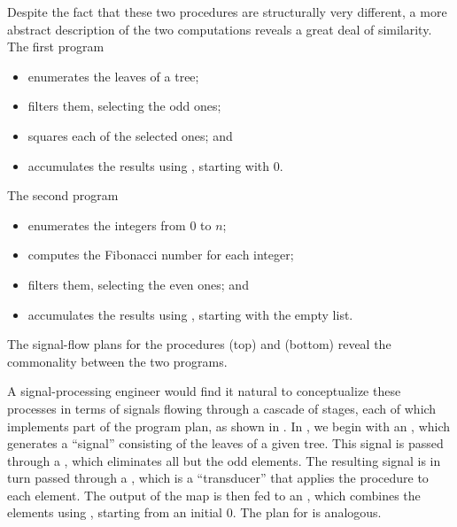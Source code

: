 \noindent
Despite the fact that these two procedures are structurally very different, a
more abstract description of the two computations reveals a great deal of
similarity.  The first program

\begin{itemize}
\item
enumerates the leaves of a tree;

\item
filters them, selecting the odd ones;

\item
squares each of the selected ones; and

\item
accumulates the results using \code{+}, starting with 0.
\end{itemize}

\noindent
The second program

\begin{itemize}
\item
enumerates the integers from 0 to \( n \);

\item
computes the Fibonacci number for each integer;

\item
filters them, selecting the even ones; and

\item
accumulates the results using ,  starting with the
empty list.
\end{itemize}

\begin{imageFigure}{The signal-flow plans for the procedures
   (top) and  (bottom) reveal the
  commonality between the two programs.}
  \resizebox{\linewidth}{!}{}
\end{imageFigure}

\noindent
A signal-processing engineer would find it natural to conceptualize these
processes in terms of signals flowing through a cascade of stages, each of
which implements part of the program plan, as shown in .  In
, we begin with an , which
generates a ``signal'' consisting of the leaves of a given tree.  This signal
is passed through a , which eliminates all but the odd
elements.  The resulting signal is in turn passed through a ,
which is a ``transducer'' that applies the  procedure to each
element.  The output of the map is then fed to an , which
combines the elements using \code{+}, starting from an initial 0.  The plan for
 is analogous.

